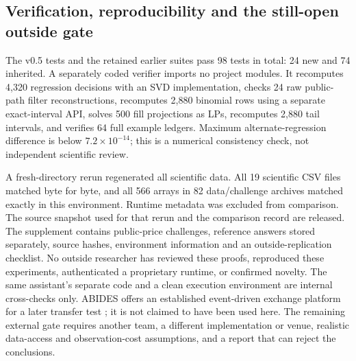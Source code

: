 \subsection{Verification, reproducibility and the still-open outside gate}
The v0.5 tests and the retained earlier suites pass 98 tests in total: 24 new and 74 inherited. A separately coded verifier imports no project modules. It recomputes 4,320 regression decisions with an SVD implementation, checks 24 raw public-path filter reconstructions, recomputes 2,880 binomial rows using a separate exact-interval API, solves 500 fill projections as LPs, recomputes 2,880 tail intervals, and verifies 64 full example ledgers. Maximum alternate-regression difference is below $7.2\times10^{-14}$; this is a numerical consistency check, not independent scientific review.

A fresh-directory rerun regenerated all scientific data. All 19 scientific CSV files matched byte for byte, and all 566 arrays in 82 data/challenge archives matched exactly in this environment. Runtime metadata was excluded from comparison. The source snapshot used for that rerun and the comparison record are released. The supplement contains public-price challenges, reference answers stored separately, source hashes, environment information and an outside-replication checklist. No outside researcher has reviewed these proofs, reproduced these experiments, authenticated a proprietary runtime, or confirmed novelty. The same assistant's separate code and a clean execution environment are internal cross-checks only. ABIDES offers an established event-driven exchange platform for a later transfer test \citep{byrd2019}; it is not claimed to have been used here. The remaining external gate requires another team, a different implementation or venue, realistic data-access and observation-cost assumptions, and a report that can reject the conclusions.
